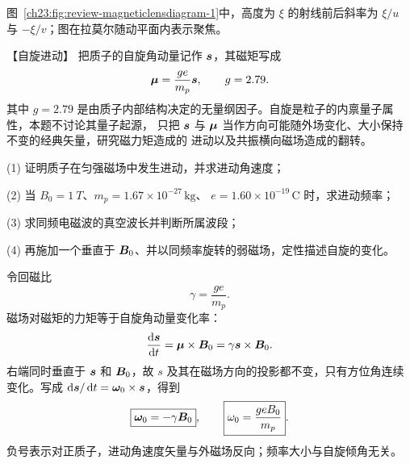 {\begin{xesolution}
图~\ref{ch23:fig:review-magneticlensdiagram-1}中，高度为 $\xi$ 的射线前后斜率为 $\xi/u$ 与 $-\xi/v$；图在拉莫尔随动平面内表示聚焦。
\par\noindent\begin{minipage}{\linewidth}
\magneticLensDiagram
{}
\end{minipage}\par\medskip
\end{xesolution}



\begin{origexamplebox}{【自旋进动】}\label{ch23:ex:s39-8-9}
把质子的自旋角动量记作 $\bm{s}$，其磁矩写成
\[
  \bm{\mu}=\frac{ge}{m_p}\bm{s},
  \qquad g=2.79.
\]
其中 $g=2.79$ 是由质子内部结构决定的无量纲因子。自旋是粒子的内禀量子属性，本题不讨论其量子起源，
只把 $\bm{s}$ 与 $\bm{\mu}$ 当作方向可能随外场变化、大小保持不变的经典矢量，研究磁力矩造成的
进动以及共振横向磁场造成的翻转。

(1) 证明质子在匀强磁场中发生进动，并求进动角速度；

(2) 当 $B_0=\SI{1}{T}$、$m_p=1.67\times10^{-27}\,\mathrm{kg}$、
$e=1.60\times10^{-19}\,\mathrm C$ 时，求进动频率；

(3) 求同频电磁波的真空波长并判断所属波段；

(4) 再施加一个垂直于 $\bm{B}_0$、并以同频率旋转的弱磁场，定性描述自旋的变化。

\begin{center}\begin{minipage}{.96\linewidth}\centering
{}
\end{minipage}\end{center}
\end{origexamplebox}

\begin{xesolution}
令回磁比
\[
  \gamma=\frac{ge}{m_p}.
\]
磁场对磁矩的力矩等于自旋角动量变化率：
\begin{equation}
  \frac{\mathop{}\!\mathrm d\bm{s}}{\mathop{}\!\mathrm d t}=\bm{\mu}\times\bm{B}_0
  =\gamma\bm{s}\times\bm{B}_0.
\end{equation}
右端同时垂直于 $\bm{s}$ 和 $\bm{B}_0$，故 $s$ 及其在磁场方向的投影都不变，只有方位角连续
变化。写成 $\mathop{}\!\mathrm d\bm{s}/\mathop{}\!\mathrm d t=\bm{\omega}_0\times\bm{s}$，得到
\begin{equation}
  \boxed{\bm{\omega}_0=-\gamma\bm{B}_0},
  \qquad
  \boxed{\omega_0=\frac{geB_0}{m_p}}.
\end{equation}
负号表示对正质子，进动角速度矢量与外磁场反向；频率大小与自旋倾角无关。


\end{xesolution}}
